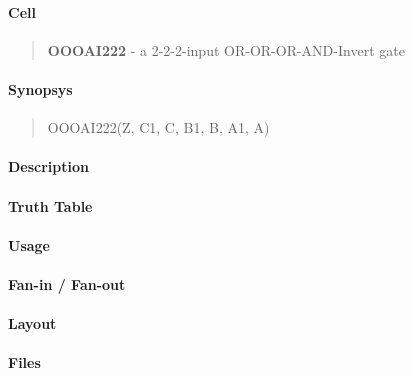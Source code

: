 \label{OOOAI222}
\paragraph{Cell}
\begin{quote}
    \textbf{OOOAI222} - a 2-2-2-input OR-OR-OR-AND-Invert gate
\end{quote}

\paragraph{Synopsys}
\begin{quote}
    OOOAI222(Z, C1, C, B1, B, A1, A)
\end{quote}

\paragraph{Description}



\paragraph{Truth Table}


\paragraph{Usage}

\paragraph{Fan-in / Fan-out}

\paragraph{Layout}

\paragraph{Files}
